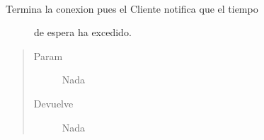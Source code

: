 \documentclass[letterpaper,10pt,spanish,openany,oneside]{sphinxmanual}
\begin{document}
\begin{fulllineitems}
\label{\detokenize{pokemonServer:pokemonServer.terminarConexion}}~\begin{description}
\item[{Termina la conexion pues el Cliente notifica que el tiempo}] \leavevmode
de espera ha excedido.

\end{description}
\begin{quote}\begin{description}
\item[{Param}] \leavevmode
Nada

\item[{Devuelve}] \leavevmode
Nada

\end{description}\end{quote}

\end{fulllineitems}



\renewcommand{\indexname}{Índice de Módulos Python}
\begin{sphinxtheindex}
\let\bigletter\sphinxstyleindexlettergroup
\bigletter{p}
\item\relax{}
\item\relax{}
\end{sphinxtheindex}

\renewcommand{\indexname}{Índice}
\printindex
\end{document}
